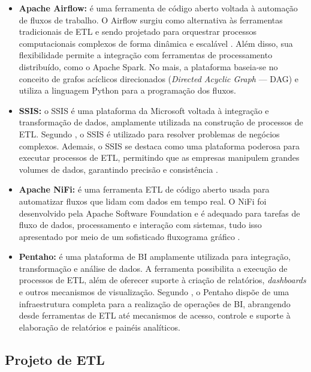 \begin{itemize}
    \item \textbf{Apache Airflow:} é uma ferramenta de código aberto voltada à automação de fluxos de
    trabalho. O Airflow surgiu como alternativa às ferramentas tradicionais de ETL e sendo 
    projetado para orquestrar processos computacionais complexos de forma dinâmica e escalável 
    \cite{eeti2022efficient}. Além disso, sua flexibilidade permite a integração com ferramentas de 
    processamento distribuído, como o Apache Spark. No mais, a plataforma baseia-se no conceito 
    de grafos acíclicos direcionados (\textit{Directed Acyclic Graph} — DAG) e utiliza a linguagem Python para a programação dos 
    fluxos. 

    \item \textbf{SSIS:} o SSIS é uma plataforma da Microsoft 
    voltada à integração e transformação de dados, amplamente utilizada na construção de processos de ETL. 
    Segundo , o SSIS é utilizado para resolver problemas de negócios 
    complexos. Ademais, o SSIS se destaca como uma plataforma poderosa para executar processos 
    de ETL, permitindo que as empresas manipulem grandes volumes de dados, garantindo precisão e 
    consistência \cite{banoth2024ssis}.

    \item \textbf{Apache NiFi:} é uma ferramenta ETL de código aberto usada para automatizar fluxos que
    lidam com dados em tempo real. O NiFi foi desenvolvido pela Apache Software Foundation e é 
    adequado para tarefas de fluxo de dados, processamento e interação com sistemas, tudo isso 
    apresentado por meio de um sofisticado fluxograma gráfico \cite{singu2022automation}. 

    \item \textbf{Pentaho:} é uma plataforma de BI amplamente utilizada para 
    integração, transformação e análise de dados. A ferramenta possibilita a execução de 
    processos de ETL, além de oferecer suporte à criação de relatórios, \textit{dashboards} e outros 
    mecanismos de visualização. Segundo , o Pentaho dispõe de uma 
    infraestrutura completa para a realização de operações de BI, abrangendo desde ferramentas 
    de ETL até mecanismos de acesso, controle e suporte à elaboração de relatórios e painéis 
    analíticos.
\end{itemize}

\subsection{Projeto de ETL}

